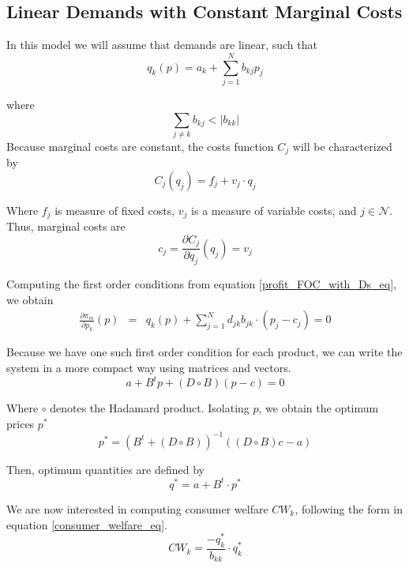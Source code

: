 \documentclass[12pt]{article}
\begin{document}
\subsection{Linear Demands with Constant Marginal Costs}

In this model we will assume that demands are linear, such that
\begin{equation*}
q_k(p) = a_k + \sum_{j=1}^N b_{kj}p_j
\end{equation*}

where
\begin{equation*}
\sum_{j \neq k} b_{kj} < |b_{kk}|
\end{equation*}
Because marginal costs are constant, the costs function $C_j$ will be characterized by
\begin{equation*}
C_j (q_j)= f_j + v_j \cdot q_j
\end{equation*}

Where $f_j$ is measure of fixed costs, $v_j$ is a measure of variable costs, and  $j \in \mathcal{N}$. Thus, marginal costs are
\begin{equation*}
c_j = \frac{\partial C_j}{\partial q_j}(q_j) = v_j
\end{equation*}

Computing the first order conditions from equation \ref{profit_FOC_with_Ds_eq}, we obtain
\begin{eqnarray*}
\frac{\partial\pi_m}{\partial p_k}(p)
&=& q_k(p) + \sum_{j = 1}^N d_{jk}b_{jk} \cdot (p_j - c_j) = 0
\end{eqnarray*}

Because we have one such first order condition for each product, we can write the system in a more compact way using matrices and vectors.
\begin{equation*}
a + B^t p + (D \circ B)(p - c) = 0
\end{equation*}

Where $\circ$ denotes the Hadamard product.
Isolating $p$, we obtain the optimum prices $p^*$
\begin{equation*}
p^* = (B^t + (D \circ B))^{-1}((D \circ B) c - a)
\end{equation*}

Then, optimum quantities are defined by
\begin{equation*}
q^* = a + B^t \cdot p^*
\end{equation*}

We are now interested in computing consumer welfare $CW_k$, following the form in equation \ref{consumer_welfare_eq}. 
\begin{equation*}
CW_k = \frac{-q_k^*}{b_{kk}} \cdot q_k^*
\end{equation*}
\end{document}
